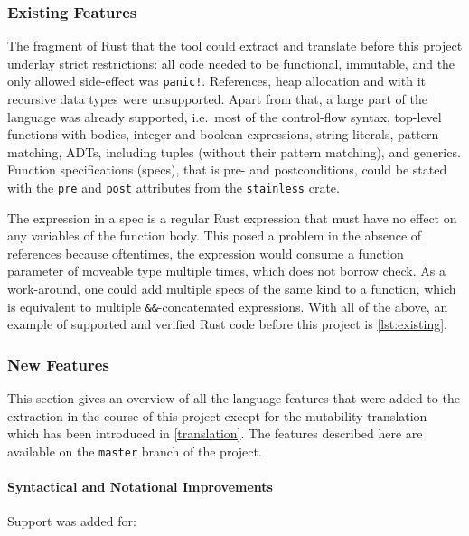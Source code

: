 \subsubsection{Existing Features}

The fragment of Rust that the tool could extract and translate before this
project underlay strict restrictions: all code needed to be functional,
immutable, and the only allowed side-effect was \lstinline"panic!". References,
heap allocation and with it recursive data types were unsupported. Apart from
that, a large part of the language was already supported, i.e.~most of the
control-flow syntax, top-level functions with bodies, integer and boolean
expressions, string literals, pattern matching, ADTs, including tuples (without
their pattern matching), and generics. Function specifications (specs), that is
pre- and postconditions, could be stated with the \lstinline!pre! and
\lstinline!post! attributes from the \lstinline!stainless! crate.

The expression in a spec is a regular Rust expression that must have no effect
on any variables of the function body. This posed a problem in the absence of
references because oftentimes, the expression would consume a function parameter
of moveable type multiple times, which does not borrow check. As a work-around,
one could add multiple specs of the same kind to a function, which is equivalent
to multiple \lstinline!&&!-concatenated expressions. With all of the above, an
example of supported and verified Rust code before this project is
\autoref{lst:existing}.

\subsubsection{New Features}

This section gives an overview of all the language features that were added to
the extraction in the course of this project except for the mutability
translation which has been introduced in \autoref{translation}. The features
described here are available on the \lstinline!master! branch of the project.

\paragraph{Syntactical and Notational Improvements}

Support was added for:

